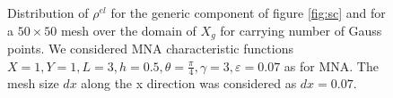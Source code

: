 \begin{figure}[!ht]
    \quad
    \caption{Distribution of $ \rho^{el}$ for the generic component of figure \ref{fig:sc} and for a $50\times50$ mesh over the domain of $X_g$ for carrying number of Gauss points. We considered MNA characteristic functions $X=1,Y=1,L=3,h=0.5,\theta=\frac{\pi}{4}, \gamma=3, \varepsilon=0.07$ as for MNA. The mesh size $dx$ along the x direction was considered as $dx=0.07$. }%
    \label{fig:MNAv234}%
\end{figure}
